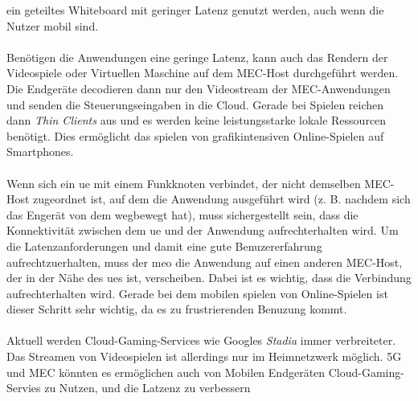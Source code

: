 \documentclass[runningheads]{llncs}
\numberwithin{figure}{section}
\begin{document}
ein geteiltes Whiteboard mit geringer Latenz genutzt werden, auch wenn die Nutzer mobil sind.
\\
\\
Benötigen die Anwendungen eine geringe Latenz, kann auch das Rendern der Videospiele oder Virtuellen Maschine auf dem MEC-Host 
durchgeführt werden. Die Endgeräte decodieren dann nur den Videostream der MEC-Anwendungen und senden die Steuerungseingaben in die Cloud.
Gerade bei Spielen reichen dann \textit{Thin Clients} aus und es werden keine leistungsstarke lokale Ressourcen benötigt. 
Dies ermöglicht das spielen von grafikintensiven Online-Spielen auf Smartphones.
\\
\\
Wenn sich ein \acrshort{ue} mit einem Funkknoten verbindet, der nicht demselben MEC-Host zugeordnet ist, 
auf dem die Anwendung ausgeführt wird (z. B. nachdem sich das Engerät von dem wegbewegt hat), 
muss sichergestellt sein, dass die Konnektivität zwischen dem \acrshort{ue} und der Anwendung aufrechterhalten wird. 
Um die Latenzanforderungen und damit eine gute Benuzererfahrung aufrechtzuerhalten, 
muss der \acrshort{meo} die Anwendung auf einen anderen MEC-Host, der in der Nähe des \acrshort{ue}s ist, verscheiben. 
Dabei ist es wichtig, dass die Verbindung aufrechterhalten wird. Gerade bei dem mobilen spielen von Online-Spielen
ist dieser Schritt sehr wichtig, da es zu frustrierenden Benuzung kommt.
\\
\\
Aktuell werden Cloud-Gaming-Services wie Googles \textit{Stadia} immer verbreiteter. Das Streamen von Videospielen ist
allerdings nur im Heimnetzwerk möglich. 5G und MEC könnten es ermöglichen auch von Mobilen Endgeräten Cloud-Gaming-Servies zu Nutzen,
und die Latzenz zu verbessern
\end{document}
